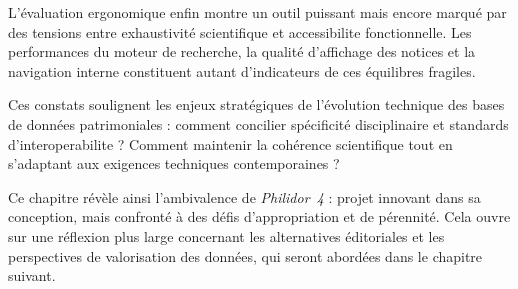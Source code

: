 L’évaluation ergonomique enfin montre un outil puissant mais encore marqué par des tensions entre exhaustivité scientifique et \gls{accessibilite} fonctionnelle. Les performances du moteur de recherche, la qualité d’affichage des notices et la navigation interne constituent autant d’indicateurs de ces équilibres fragiles.

Ces constats soulignent les enjeux stratégiques de l'évolution technique des bases de données patrimoniales : comment concilier spécificité disciplinaire et standards d'\gls{interoperabilite} ? Comment maintenir la cohérence scientifique tout en s'adaptant aux exigences techniques contemporaines ?

Ce chapitre révèle ainsi l’ambivalence de \textit{Philidor~4} : projet innovant dans sa conception, mais confronté à des défis d’appropriation et de pérennité. Cela ouvre sur une réflexion plus large concernant les alternatives éditoriales et les perspectives de valorisation des données, qui seront abordées dans le chapitre suivant.